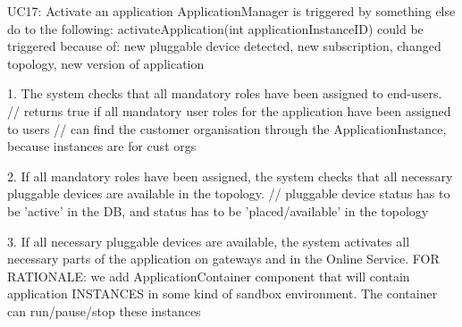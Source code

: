 {{{        UC17: Activate an application
            ApplicationManager is triggered by something else do to the following: activateApplication(int applicationInstanceID)
            could be triggered because of: new pluggable device detected, new subscription, changed topology, new version of application

            1. The system checks that all mandatory roles have been assigned to end-users.
                // returns true if all mandatory user roles for the application have been assigned to users
                // can find the customer organisation through the ApplicationInstance, because instances are for cust orgs

            2. If all mandatory roles have been assigned, the system checks that all necessary pluggable devices are available in the topology.
                // pluggable device status has to be 'active' in the DB, and status has to be 'placed/available' in the topology

            3. If all necessary pluggable devices are available, the system activates all necessary parts of the application on gateways and in the Online Service.
                FOR RATIONALE: we add ApplicationContainer component that will contain application INSTANCES in some kind of sandbox environment. The container can run/pause/stop these instances

}}}
